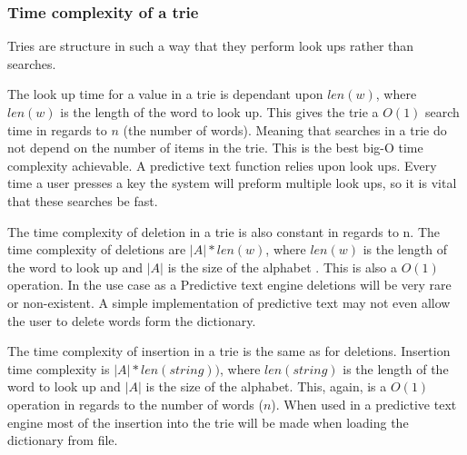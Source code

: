 \documentclass[10pt]{article} %
\begin{document}
			\subsubsection{Time complexity of a trie}
			    Tries are structure in such a way that they perform look ups rather than searches.
			
				The look up time for a value in a trie is dependant upon \begin{math}len(w)\end{math}, where \begin{math}len(w)\end{math} is the length of the word to look up\cite{book:ADS:complexity}. This gives the trie a \begin{math} O(1) \end{math} search time in regards to \begin{math} n \end{math} (the number of words). Meaning that searches in a trie do not depend on the number of items in the trie. This is the best big-O time complexity achievable. A predictive text function relies upon look ups. Every time a user presses a key the system will preform multiple look ups, so it is vital that these searches be fast. 
				
				The time complexity of deletion in a trie is also constant in regards to n. The time complexity of deletions are \begin{math}\vert A \vert * len(w)\end{math}, where \begin{math}len(w)\end{math} is the length of the word to look up and \begin{math}\vert A \vert \end{math} is the size of the alphabet \cite{book:ADS:complexity}.
				This is also a \begin{math} O(1) \end{math} operation.
				In the use case as a Predictive text engine deletions will be very rare or non-existent.
				A simple implementation of predictive text may not even allow the user to delete words form the dictionary. 
				
				The time complexity of insertion in a trie is the same as for deletions. Insertion time complexity is \begin{math}\vert A \vert  * len(string))\end{math}, where \begin{math}len(string)\end{math} is the length of the word to look up and \begin{math}\vert A \vert \end{math} is the size of the alphabet\cite{book:ADS:complexity}.
				This, again, is a \begin{math} O(1) \end{math} operation in regards to the number of words (\begin{math}n\end{math}).
				When used in a predictive text engine most of the insertion into the trie will be made when loading the dictionary from file. 
				
\end{document}
